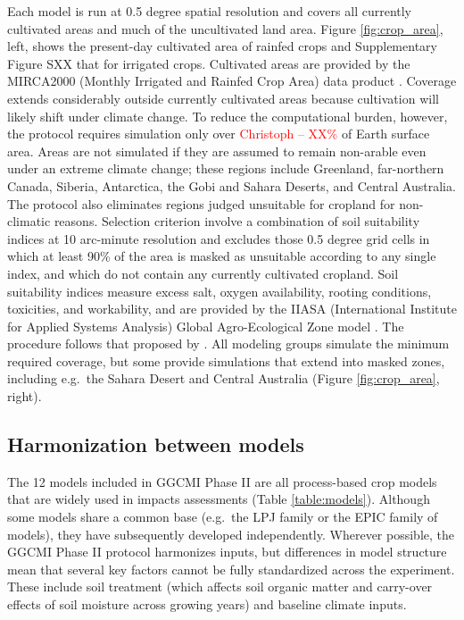\documentclass[gmd, manuscript]{copernicus} %
\begin{document}
Each model is run at 0.5 degree spatial resolution and covers all currently cultivated areas and much of the uncultivated land area. 
Figure \ref{fig:crop_area}, left, shows the present-day cultivated area of rainfed crops and Supplementary Figure SXX that for irrigated crops. 
Cultivated areas are provided by the MIRCA2000 (Monthly Irrigated and Rainfed Crop Area) data product \citep{Portmann2010}.
Coverage extends considerably outside currently cultivated areas because cultivation will likely shift under climate change.  
To reduce the computational burden, however, the protocol requires simulation only over \textcolor{red}{Christoph -- XX\%} of Earth surface area.  
Areas are not simulated if they are assumed to remain non-arable even under an extreme climate change; these regions include Greenland, far-northern Canada, Siberia, Antarctica, the Gobi and Sahara Deserts, and Central Australia.
The protocol also eliminates regions judged unsuitable for cropland for non-climatic reasons. 
Selection criterion involve a combination of soil suitability indices at 10 arc-minute resolution and excludes those 0.5 degree grid cells in which at least 90\% of the area is masked as unsuitable according to any single index, and which do not contain any currently cultivated cropland. 
Soil suitability indices measure excess salt, oxygen availability, rooting conditions, toxicities, and workability, and are provided by the IIASA (International Institute for Applied Systems Analysis) Global Agro-Ecological Zone model \citep[GAEZ, ][]{gaez}. 
The procedure follows that proposed by \citet{pugh_climate_2016}. 
All modeling groups simulate the minimum required coverage, but some provide simulations that extend into masked zones, including e.g.\ the Sahara Desert and Central Australia (Figure \ref{fig:crop_area}, right).

\subsection{Harmonization between models}
The 12 models included in GGCMI Phase II are all process-based crop models that are widely used in impacts assessments (Table \ref{table:models}).
Although some models share a common base (e.g.\ the LPJ family or the EPIC family of models), they have subsequently developed independently.  
Wherever possible, the GGCMI Phase II protocol harmonizes inputs, but
differences in model structure mean that several key factors cannot be fully standardized across the experiment. These include soil treatment (which affects soil organic matter and carry-over effects of soil moisture across growing years) and baseline climate inputs.  
\end{document}
